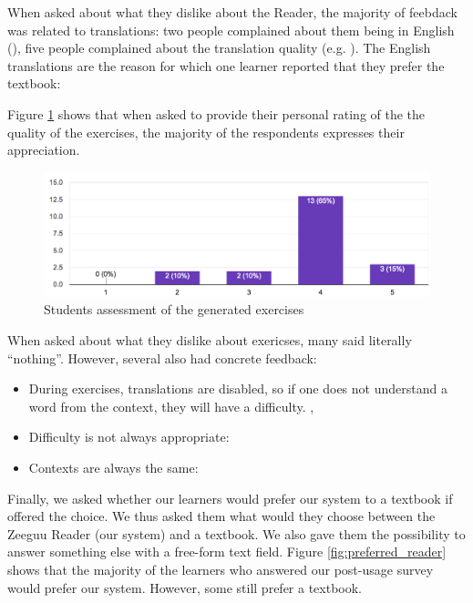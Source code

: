 When asked about what they dislike about the Reader, the majority of feebdack was related to translations: two people complained about them being in English (), five people complained about the translation quality (e.g. ). The English translations are the reason for which one learner reported that they prefer the textbook: 

Figure \ref{fig:ex_rating} shows that when asked to provide their personal rating of the the quality of the exercises, the majority of the respondents expresses their appreciation. 

 \begin{figure}[h!]
    \centering
      \includegraphics[width=0.8\columnwidth]{figures/opinions/exercises_rating}
      \caption{Students assessment  of the generated exercises}
      \label{fig:ex_rating}
    \end{figure}

When asked about what they dislike about exericses, many said literally ``nothing''. However, several also had concrete feedback: 
\begin{itemize}
	\item During exercises, translations are disabled, so if one does not understand a word from the context, they will have a difficulty.
		,
	\item Difficulty is not always appropriate: 
	\item Contexts are always the same: 
\end{itemize}

Finally, we asked whether our learners would prefer our system to a textbook if offered the choice. We thus asked them what would they choose between the Zeeguu Reader (our system) and a textbook. We also gave them the possibility to answer something else with a free-form text field. Figure \ref{fig:preferred_reader} shows that the majority of the learners who answered our post-usage survey would prefer our system. However, some still prefer a textbook. 


